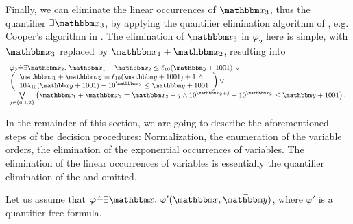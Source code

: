 Finally, we can eliminate the linear occurrences of $\ivarx_3$, thus the quantifier $\exists \ivarx_3$, by applying the quantifier elimination algorithm of {\pa}, e.g. Cooper's algorithm in \cite{Cooper72}. The elimination of $\ivarx_3$ in $\varphi_2$ here is simple, with $\ivarx_3$ replaced by $\ivarx_1 + \ivarx_2$, resulting into  
\[
\small
\begin{array}{l}
\varphi_3 \Def \exists \ivarx_2.\ 
\ivarx_1 + \ivarx_2 \le \ell_{10}(\ivary+1001)\ \vee \\
\left(
\begin{array}{l}
\ivarx_1 + \ivarx_2 = \ell_{10}(\ivary+1001)+1\ \wedge \\
10 \lambda_{10}(\ivary+1001) - 10^{\ivarx_2} \le \ivary + 1001 
\end{array}
\right) \vee \\
%
 \bigvee \limits_{j \in \{0,1,2\}}  \left(\ivarx_1 + \ivarx_2 = \ivarx_2 +j \wedge 10^{\ivarx_2 + j} - 10^{\ivarx_2} \le \ivary + 1001\right).
\end{array}
\]

In the remainder of this section, we are going to describe the aforementioned steps of the decision procedures: Normalization, the enumeration of the variable orders, 
the elimination of the exponential occurrences of variables. The elimination of the  linear occurrences of variables is essentially the quantifier elimination of the {\pa} and omitted.

Let us assume that $\varphi \Def \exists \ivarx.\ \varphi'(\ivarx, \vec{\ivary})$, where $\varphi'$ is a quantifier-free formula. 



